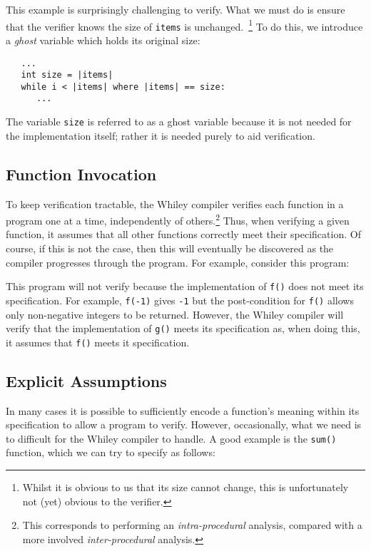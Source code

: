 

This example is surprisingly challenging to verify.  What we must do
is ensure that the verifier knows the size of \lstinline{items} is
unchanged.~\footnote{Whilst it is obvious to us that its size cannot
  change, this is unfortunately not (yet) obvious to the verifier.} To
do this, we introduce a {\em ghost} variable which holds its original
size:

\begin{lstlisting}
   ...
   int size = |items|
   while i < |items| where |items| == size:
      ...
\end{lstlisting}

The variable \lstinline{size} is referred to as a ghost variable
because it is not needed for the implementation itself; rather it is
needed purely to aid verification.

\subsection{Function Invocation}

To keep verification tractable, the Whiley compiler verifies each
function in a program one at a time, independently of
others.\footnote{This corresponds to performing an {\em
    intra-procedural} analysis, compared with a more involved {\em
    inter-procedural} analysis.}  Thus, when verifying a given
function, it assumes that all other functions correctly meet their
specification.  Of course, if this is not the case, then this will
eventually be discovered as the compiler progresses through the
program.  For example, consider this program:



This program will not verify because the implementation of
\lstinline{f()} does not meet its specification.  For example,
\lstinline{f(-1)} gives \lstinline{-1} but the post-condition for
\lstinline{f()} allows only non-negative integers to be returned.
However, the Whiley compiler will verify that the implementation of
\lstinline{g()} meets its specification as, when doing this, it
assumes that \lstinline{f()} meets it specification.

\subsection{Explicit Assumptions}

In many cases it is possible to sufficiently encode a function's meaning within its specification to allow a program to verify.  However, occasionally, what we need is to difficult for the Whiley compiler to handle.  A good example is the \lstinline{sum()} function, which we can try to specify as follows:

